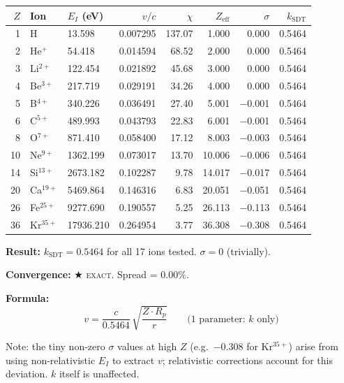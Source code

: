 \begin{center}
\small
\begin{tabular}{rllrrrrr}
\hline
$Z$ & Ion & $E_I$ (eV) & $v/c$ & $\chi$ & $Z_{\text{eff}}$ & $\sigma$ & $k_{\text{SDT}}$ \\
\hline
 1 & H         &   13.598 & 0.007295 & 137.07 &  1.000 &  0.000 & 0.5464 \\
 2 & He$^+$    &   54.418 & 0.014594 &  68.52 &  2.000 &  0.000 & 0.5464 \\
 3 & Li$^{2+}$ &  122.454 & 0.021892 &  45.68 &  3.000 &  0.000 & 0.5464 \\
 4 & Be$^{3+}$ &  217.719 & 0.029191 &  34.26 &  4.000 &  0.000 & 0.5464 \\
 5 & B$^{4+}$  &  340.226 & 0.036491 &  27.40 &  5.001 & $-$0.001 & 0.5464 \\
 6 & C$^{5+}$  &  489.993 & 0.043793 &  22.83 &  6.001 & $-$0.001 & 0.5464 \\
 8 & O$^{7+}$  &  871.410 & 0.058400 &  17.12 &  8.003 & $-$0.003 & 0.5464 \\
10 & Ne$^{9+}$ & 1362.199 & 0.073017 &  13.70 & 10.006 & $-$0.006 & 0.5464 \\
14 & Si$^{13+}$& 2673.182 & 0.102287 &   9.78 & 14.017 & $-$0.017 & 0.5464 \\
20 & Ca$^{19+}$& 5469.864 & 0.146316 &   6.83 & 20.051 & $-$0.051 & 0.5464 \\
26 & Fe$^{25+}$& 9277.690 & 0.190557 &   5.25 & 26.113 & $-$0.113 & 0.5464 \\
36 & Kr$^{35+}$&17936.210 & 0.264954 &   3.77 & 36.308 & $-$0.308 & 0.5464 \\
\hline
\end{tabular}
\end{center}

\textbf{Result:} $k_{\text{SDT}} = 0.5464$ for all 17 ions tested.  $\sigma = 0$ (trivially).

\textbf{Convergence:} $\bigstar$ \textsc{exact}.  Spread = $0.00\%$.

\textbf{Formula:}
\begin{equation}
  v = \frac{c}{0.5464}\,\sqrt{\frac{Z \cdot R_p}{r}} \qquad\text{(1 parameter: $k$ only)}
\end{equation}

Note: the tiny non-zero $\sigma$ values at high $Z$ (e.g.\ $-0.308$ for Kr$^{35+}$) arise from using non-relativistic $E_I$ to extract $v$; relativistic corrections account for this deviation.  $k$ itself is unaffected.


